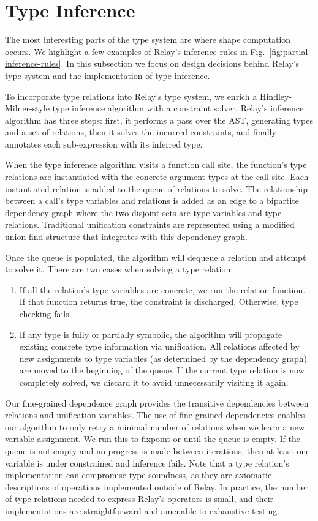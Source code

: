 \section{Type Inference}
\label{sec:inference}

The most interesting parts of the type system
  are where shape computation occurs.
We highlight a few examples of Relay's inference
  rules in Fig.~\ref{fig:partial-inference-rules}.
In this subsection we focus on design decisions behind Relay's type system
  and the implementation of type inference.

To incorporate type relations into Relay's type system, we enrich
  a Hindley-Milner-style type inference algorithm with
  a constraint solver.
Relay's inference algorithm has three steps: first, it
  performs a pass over the AST,
  generating types and a set of relations,
  then it solves the incurred constraints,
  and finally annotates each sub-expression with its inferred type.

When the type inference algorithm visits a function call site,
  the function's type relations are
  instantiated with the concrete argument types at the call site.
Each instantiated relation is added to the queue of relations to solve.
The relationship between a call's type variables and relations is added as an edge to
  a bipartite dependency graph where the two disjoint sets are type variables and type relations.
Traditional unification constraints are represented using a
  modified union-find structure that integrates with this dependency graph.

Once the queue is populated, the algorithm will dequeue a relation and attempt to solve it.
There are two cases when solving a type relation:
\begin{enumerate}
\item If all the relation's type variables
are concrete, we run the relation function. If that function returns true, the
constraint is discharged. Otherwise, type checking fails.
\item If any type is fully or partially symbolic, the
  algorithm will propagate
  existing concrete type information via unification.
All relations affected by new assignments to type
  variables (as determined by the dependency graph)
  are moved to the beginning of the queue.
If the current type relation is now completely solved, we
discard it to avoid unnecessarily visiting it again.
\end{enumerate}

Our fine-grained dependence graph provides the transitive dependencies
  between relations and unification variables.
The use of fine-grained dependencies enables our algorithm to
  only retry a minimal number of relations when we
  learn a new variable assignment.
We run this to fixpoint or until the queue is empty.
If the queue is not empty and no progress is made between iterations,
  then at least one variable is under constrained and inference fails.
Note that a type relation's implementation can
  compromise type soundness, as they are axiomatic descriptions
  of operations implemented outside of Relay.
In practice, the number of type relations needed to express Relay's
  operators is small, and their implementations are straightforward
  and amenable to exhaustive testing.

